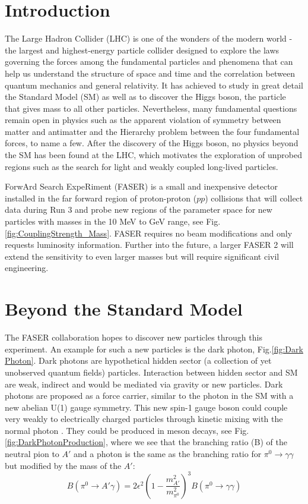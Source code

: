 \section{Introduction} %

The Large Hadron Collider (LHC) is one of the wonders of the modern world - the largest and highest-energy particle collider designed to explore the laws governing the forces among the fundamental particles and phenomena that can help us understand the structure of space and time and the correlation between quantum mechanics and general relativity. It has achieved to study in great detail the Standard Model (SM) as well as to discover the Higgs boson, the particle that gives mass to all other particles. Nevertheless, many fundamental questions remain open in physics such as the apparent violation of symmetry between matter and antimatter and the Hierarchy problem between the four fundamental forces, to name a few.
After the discovery of the Higgs boson, no physics beyond the SM has been found at the LHC, which motivates the exploration of unprobed regions such as the search for light and weakly coupled long-lived particles.

ForwArd Search ExpeRiment (FASER) is a small and inexpensive detector installed in the far forward region of proton-proton ($pp$) collisions that will collect data during Run 3 and probe new regions of the parameter space for new particles with masses in the 10 MeV to GeV range, see Fig. \ref{fig:CouplingStrength_Mass}.
FASER requires no beam modifications and only requests luminosity  information. Further into the future, a larger
 FASER 2 will extend the sensitivity to even larger masses but will require significant civil engineering.

\section{Beyond the Standard Model}

The FASER collaboration hopes to discover new particles through this experiment. An example for such a new particles is the dark photon, Fig.\ref{fig:Dark Photon}. Dark photons are hypothetical hidden sector (a collection of yet unobserved quantum fields) particles. Interaction between hidden sector and SM are weak, indirect and would be mediated via gravity or new particles. Dark photons are proposed as a force carrier, similar to the photon in the SM with a new abelian U(1) gauge symmetry. This new spin-1 gauge boson could couple very weakly to electrically charged particles through kinetic mixing with the normal photon \cite{noauthor_dark_2019}.
They could be produced in meson decays, see Fig. \ref{fig:DarkPhotonProduction}, where we see that the branching ratio (B) of the neutral pion to $A'$ and a photon is the same as the branching ratio for $\pi^0 \rightarrow \gamma\gamma$ but modified by the mass of  the $A'$:
\[
B(\pi^0 \rightarrow A'\gamma)=2\epsilon^2\left( 1-\frac{m^2_{A'}}{m^2_{\pi^0}} \right)^3B(\pi^0 \rightarrow \gamma\gamma)
\]

